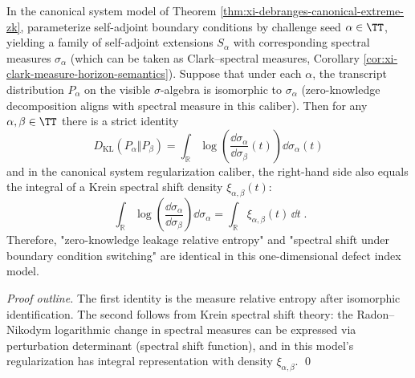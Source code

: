 \begin{proposition}\label{prop:xi-krein-spectral-shift-equals-kl}
In the canonical system model of Theorem \ref{thm:xi-debranges-canonical-extreme-zk}, parameterize self-adjoint boundary conditions by challenge seed \(\alpha\in\TT\), yielding a family of self-adjoint extensions \(S_\alpha\) with corresponding spectral measures \(\sigma_\alpha\) (which can be taken as Clark--spectral measures, Corollary \ref{cor:xi-clark-measure-horizon-semantics}).
Suppose that under each \(\alpha\), the transcript distribution \(P_\alpha\) on the visible \(\sigma\)-algebra is isomorphic to \(\sigma_\alpha\) (zero-knowledge decomposition aligns with spectral measure in this caliber).
Then for any \(\alpha,\beta\in\TT\) there is a strict identity
\[
\boxed{\;
D_{\mathrm{KL}}(P_\alpha\Vert P_\beta)
=\int_{\mathbb{R}}\log\!\left(\frac{\dd\sigma_\alpha}{\dd\sigma_\beta}(t)\right)\dd\sigma_\alpha(t)\;}
\]
and in the canonical system regularization caliber, the right-hand side also equals the integral of a Krein spectral shift density \(\xi_{\alpha,\beta}(t)\):
\[
\boxed{\;
\int_{\mathbb{R}}\log\!\left(\frac{\dd\sigma_\alpha}{\dd\sigma_\beta}\right)\dd\sigma_\alpha
=\int_{\mathbb{R}}\xi_{\alpha,\beta}(t)\,\dd t\; }.
\]
Therefore, "zero-knowledge leakage relative entropy" and "spectral shift under boundary condition switching" are identical in this one-dimensional defect index model.
\end{proposition}
\begin{proof}[Proof outline]
The first identity is the measure relative entropy after isomorphic identification.
The second follows from Krein spectral shift theory: the Radon--Nikodym logarithmic change in spectral measures can be expressed via perturbation determinant (spectral shift function), and in this model's regularization has integral representation with density \(\xi_{\alpha,\beta}\). \qed
\end{proof}

